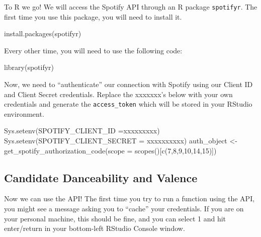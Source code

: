 \documentclass[
  letterpaper,
  DIV=11,
  numbers=noendperiod]{scrreprt}
\newenvironment{Shaded}{\begin{snugshade}}{\end{snugshade}}
\newcommand{\AttributeTok}[1]{\textcolor[rgb]{0.40,0.45,0.13}{#1}}
\newcommand{\DecValTok}[1]{\textcolor[rgb]{0.68,0.00,0.00}{#1}}
\newcommand{\FunctionTok}[1]{\textcolor[rgb]{0.28,0.35,0.67}{#1}}
\newcommand{\NormalTok}[1]{\textcolor[rgb]{0.00,0.23,0.31}{#1}}
\newcommand{\OtherTok}[1]{\textcolor[rgb]{0.00,0.23,0.31}{#1}}
\newcommand{\StringTok}[1]{\textcolor[rgb]{0.13,0.47,0.30}{#1}}
\begin{document}
To R we go! We will access the Spotify API through an R package
\texttt{spotifyr}. The first time you use this package, you will need to
install it.

\begin{Shaded}
\begin{Highlighting}[]
\FunctionTok{install.packages}\NormalTok{(}\StringTok{\textquotesingle{}spotifyr\textquotesingle{}}\NormalTok{)}
\end{Highlighting}
\end{Shaded}

Every other time, you will need to use the following code:

\begin{Shaded}
\begin{Highlighting}[]
\FunctionTok{library}\NormalTok{(spotifyr)}
\end{Highlighting}
\end{Shaded}

Now, we need to ``authenticate'' our connection with Spotify using our
Client ID and Client Secret credentials. Replace the xxxxxxx's below
with your own credentials and generate the \texttt{access\_token} which
will be stored in your RStudio environment.

\begin{Shaded}
\begin{Highlighting}[]
\FunctionTok{Sys.setenv}\NormalTok{(}\AttributeTok{SPOTIFY\_CLIENT\_ID =}\StringTok{\textquotesingle{}xxxxxxxxx\textquotesingle{}}\NormalTok{)}
\FunctionTok{Sys.setenv}\NormalTok{(}\AttributeTok{SPOTIFY\_CLIENT\_SECRET =} \StringTok{\textquotesingle{}xxxxxxxxxx\textquotesingle{}}\NormalTok{)}
\NormalTok{auth\_object }\OtherTok{\textless{}{-}} \FunctionTok{get\_spotify\_authorization\_code}\NormalTok{(}\AttributeTok{scope =} \FunctionTok{scopes}\NormalTok{()[}\FunctionTok{c}\NormalTok{(}\DecValTok{7}\NormalTok{,}\DecValTok{8}\NormalTok{,}\DecValTok{9}\NormalTok{,}\DecValTok{10}\NormalTok{,}\DecValTok{14}\NormalTok{,}\DecValTok{15}\NormalTok{)])}
\end{Highlighting}
\end{Shaded}

\hypertarget{candidate-danceability-and-valence}{%
\subsection{Candidate Danceability and
Valence}\label{candidate-danceability-and-valence}}

Now we can use the API! The first time you try to run a function using
the API, you might see a message asking you to ``cache'' your
credentials. If you are on your personal machine, this should be fine,
and you can select 1 and hit enter/return in your bottom-left RStudio
Console window.
\end{document}
